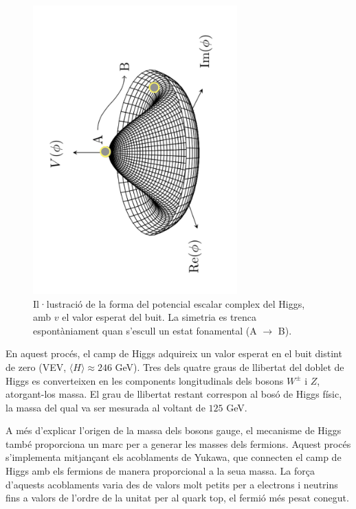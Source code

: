 \begin{figure}[htbp]
  \centering
  \includegraphics[angle=-90,width=0.7\textwidth]{images/mexican_hat.pdf}
  \caption{Il·lustració de la forma del potencial escalar complex del Higgs, amb $v$ el valor esperat del buit. La simetria es trenca espontàniament quan s’escull un estat fonamental (A $\rightarrow$ B).}
  \label{res:mexican_hat}
\end{figure}

En aquest procés, el camp de Higgs adquireix un valor esperat en el buit distint de zero (VEV, \(\langle H \rangle \approx 246\) GeV). Tres dels quatre graus de llibertat del doblet de Higgs es converteixen en les components longitudinals dels bosons \(W^\pm\) i \(Z\), atorgant-los massa. El grau de llibertat restant correspon al bosó de Higgs físic, la massa del qual va ser mesurada al voltant de \(125\) GeV.  

A més d’explicar l’origen de la massa dels bosons gauge, el mecanisme de Higgs també proporciona un marc per a generar les masses dels fermions. Aquest procés s’implementa mitjançant els acoblaments de Yukawa, que connecten el camp de Higgs amb els fermions de manera proporcional a la seua massa. La força d’aquests acoblaments varia des de valors molt petits per a electrons i neutrins fins a valors de l’ordre de la unitat per al quark top, el fermió més pesat conegut.  

